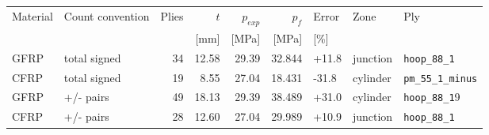 \begin{tabular}{llrrrrlll}
\toprule
Material & Count convention & Plies & $t$ & $p_{exp}$ & $p_f$ & Error & Zone & Ply\\
 & & & [mm] & [MPa] & [MPa] & [\%] & & \\
\midrule
GFRP & total signed & 34 & 12.58 & 29.39 & 32.844 & +11.8 & junction & \texttt{hoop\_88\_1}\\
CFRP & total signed & 19 & 8.55 & 27.04 & 18.431 & -31.8 & cylinder & \texttt{pm\_55\_1\_minus}\\
GFRP & +/- pairs & 49 & 18.13 & 29.39 & 38.489 & +31.0 & cylinder & \texttt{hoop\_88\_1}9\\
CFRP & +/- pairs & 28 & 12.60 & 27.04 & 29.989 & +10.9 & junction & \texttt{hoop\_88\_1}\\
\bottomrule
\end{tabular}
